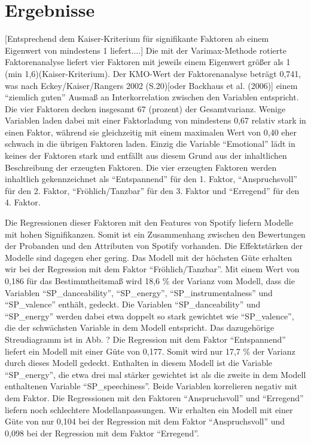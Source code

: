 \section*{Ergebnisse}
\label{sec:Ergebnisse}
[Entsprechend dem Kaiser-Kriterium für signifikante Faktoren ab einem Eigenwert von mindestens 1 liefert....]
Die mit der Varimax-Methode rotierte Faktorenanalyse liefert vier Faktoren mit jeweils einem Eigenwert größer als 1 (min 1,6)(Kaiser-Kriterium).
Der KMO-Wert der Faktorenanalyse beträgt 0,741, was nach Eckey/Kaiser/Rangers 2002 (S.20)[oder Backhaus et al. (2006)] einem ``ziemlich guten'' Ausmaß an Interkorrelation zwischen den Variablen entspricht.
Die vier Faktoren decken insgesamt 67 (prozent) der Gesamtvarianz.
Wenige Variablen laden dabei mit einer Faktorladung von mindestens 0,67 relativ stark in einen Faktor, während sie gleichzeitig mit einem maximalen Wert von 0,40 eher schwach in die übrigen Faktoren laden.
Einzig die Variable ``Emotional'' lädt in keines der Faktoren stark und entfällt aus diesem Grund aus der inhaltlichen Beschreibung der erzeugten Faktoren.
Die vier erzeugten Faktoren werden inhaltlich gekennzeichnet als ``Entspannend'' für den 1. Faktor, ``Anspruchsvoll'' für den 2.
Faktor, ``Fröhlich/Tanzbar'' für den 3. Faktor und ``Erregend'' für den 4. Faktor.   

Die Regressionen dieser Faktoren mit den Features von Spotify liefern Modelle mit hohen Signifikanzen. Somit ist ein Zusammenhang zwischen den Bewertungen der Probanden und den Attributen von Spotify vorhanden.
Die Effektstärken der Modelle sind dagegen eher gering.
Das Modell mit der höchsten Güte erhalten wir bei der Regression mit dem Faktor ``Fröhlich/Tanzbar''.
Mit einem Wert von 0,186 für das Bestimmtheitsmaß wird 18,6 \% der Varianz vom Modell, dass die Variablen ``SP\_danceability'', ``SP\_energy'', ``SP\_instrumentalness'' und ``SP\_valence'' enthält, gedeckt.
Die Variablen ``SP\_danceability'' und ``SP\_energy'' werden dabei etwa doppelt so stark gewichtet wie ``SP\_valence'', die der schwächsten Variable in dem Modell entspricht.
Das dazugehörige Streudiagramm ist in Abb. ?   
Die Regression mit dem Faktor ``Entspannend'' liefert ein Modell mit einer Güte von 0,177.
Somit wird nur 17,7 \% der Varianz durch dieses Modell gedeckt.
Enthalten in diesem Modell ist die Variable ``SP\_energy'', die etwa drei mal stärker gewichtet ist als die zweite in dem Modell enthaltenen Variable ``SP\_speechiness''.
Beide Variablen korrelieren negativ mit dem Faktor.
Die  Regressionen mit den Faktoren ``Anspruchsvoll'' und ``Erregend'' liefern noch schlechtere Modellanpassungen.
Wir erhalten ein Modell mit einer Güte von nur 0,104 bei der Regression mit dem Faktor ``Anspruchsvoll'' und 0,098 bei der Regression mit dem Faktor ``Erregend''.


